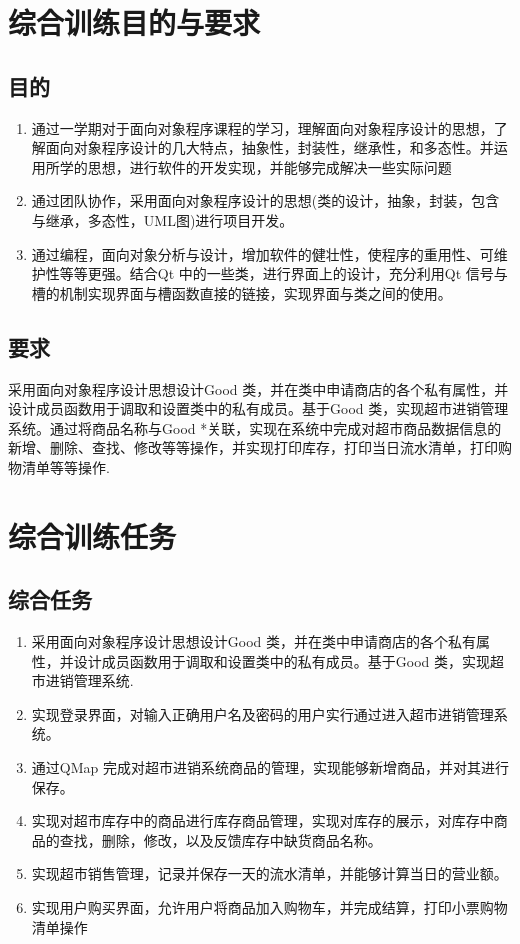 \documentclass[
   projtype=report, %
   output=print,     %
  ]{nwafuprojrep}
\begin{document}

\makecover
\tableofcontents
\newpage
\cleardoublepage
\section{综合训练目的与要求}
\subsection{目的}
\begin{enumerate}
	\item 
	通过一学期对于面向对象程序课程的学习，理解面向对象程序设计的思想，了解面向对象程序设计的几大特点，抽象性，封装性，继承性，和多态性。并运用所学的思想，进行软件的开发实现，并能够完成解决一些实际问题
	\item 
	通过团队协作，采用面向对象程序设计的思想(类的设计，抽象，封装，包含与继承，多态性，UML图)进行项目开发。
	\item 
	通过\ccpp 编程，面向对象分析与设计，增加软件的健壮性，使程序的重用性、可维护性等等更强。结合Qt 中的一些类，进行界面上的设计，充分利用Qt 信号与槽的机制实现界面与槽函数直接的链接，实现界面与类之间的使用。
\end{enumerate}
\subsection{要求}
	采用面向对象程序设计思想设计Good 类，并在类中申请商店的各个私有属性，并设计成员函数用于调取和设置类中的私有成员。基于Good 类，实现超市进销管理系统。通过将商品名称与Good *关联，实现在系统中完成对超市商品数据信息的新增、删除、查找、修改等等操作，并实现打印库存，打印当日流水清单，打印购物清单等等操作.

\section{综合训练任务}
\subsection{综合任务}
\begin{enumerate}
	\item 采用面向对象程序设计思想设计Good 类，并在类中申请商店的各个私有属性，并设计成员函数用于调取和设置类中的私有成员。基于Good 类，实现超市进销管理系统.
	\item 实现登录界面，对输入正确用户名及密码的用户实行通过进入超市进销管理系统。
	\item 通过QMap 完成对超市进销系统商品的管理，实现能够新增商品，并对其进行保存。
	\item 实现对超市库存中的商品进行库存商品管理，实现对库存的展示，对库存中商品的查找，删除，修改，以及反馈库存中缺货商品名称。
	\item 实现超市销售管理，记录并保存一天的流水清单，并能够计算当日的营业额。
	\item 实现用户购买界面，允许用户将商品加入购物车，并完成结算，打印小票购物清单操作
\end{enumerate}
\end{document}
